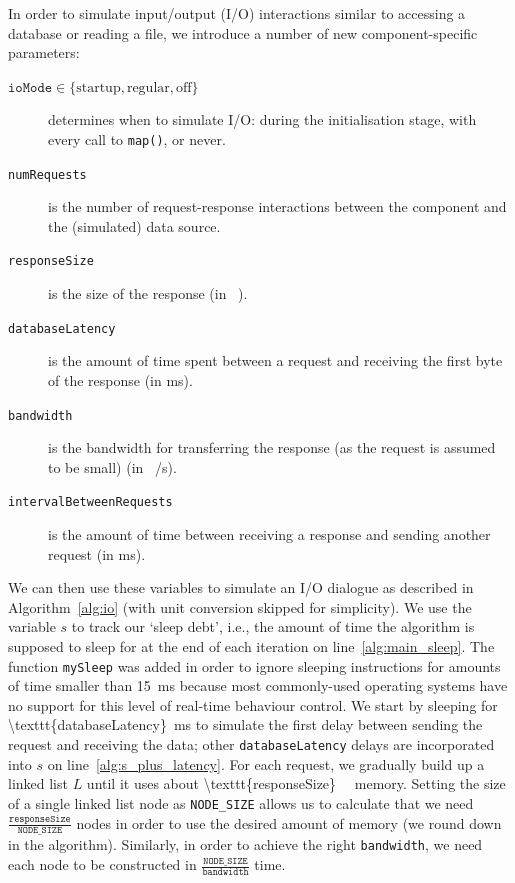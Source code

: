 \documentclass{article}
\begin{document}
In order to simulate input/output (I/O) interactions similar to accessing a
database or reading a file, we introduce a number of new component-specific
parameters:
\begin{description}
\item[$\texttt{ioMode} \in \{ \text{startup}, \text{regular}, \text{off} \}$]
  determines when to simulate I/O: during the initialisation stage, with every
  call to \texttt{map()}, or never.
\item[\texttt{numRequests}] is the number of request-response interactions
  between the component and the (simulated) data source.
\item[\texttt{responseSize}] is the size of the response (in \si{\kibi\byte}).
\item[\texttt{databaseLatency}] is the amount of time spent between a request
  and receiving the first byte of the response (in \si{\milli\second}).
\item[\texttt{bandwidth}] is the bandwidth for transferring the response (as the
  request is assumed to be small) (in
  \si[per-mode=symbol]{\mebi\bit\per\second}).
\item[\texttt{intervalBetweenRequests}] is the amount of time between receiving
  a response and sending another request (in \si{\milli\second}).
\end{description}

We can then use these variables to simulate an I/O dialogue as described in
Algorithm~\ref{alg:io} (with unit conversion skipped for
simplicity). We use the variable $s$ to track our `sleep debt', i.e., the amount
of time the algorithm is supposed to sleep for at the end of each iteration on
line~\ref{alg:main_sleep}. The function \texttt{mySleep} was added in order to
ignore sleeping instructions for amounts of time smaller than
\SI{15}{\milli\second} because most commonly-used operating systems have no
support for this level of real-time behaviour control. We start by sleeping for
\SI[number-math-rm=\mathnormal,parse-numbers=false]{\texttt{databaseLatency}}{\milli\second}
to simulate the first delay between sending the request and receiving the data;
other \texttt{databaseLatency} delays are incorporated into $s$ on
line~\ref{alg:s_plus_latency}. For each request, we gradually build up a linked
list $L$ until it uses about
\SI[number-math-rm=\mathnormal,parse-numbers=false]{\texttt{responseSize}}{\kibi\byte}
memory. Setting the size of a single linked list node as \texttt{NODE\_SIZE}
allows us to calculate that we need
$\frac{\texttt{responseSize}}{\texttt{NODE\_SIZE}}$ nodes in order to use the
desired amount of memory (we round down in the algorithm). Similarly, in order
to achieve the right \texttt{bandwidth}, we need each node to be constructed in
$\frac{\texttt{NODE\_SIZE}}{\texttt{bandwidth}}$ time.
\end{document}
